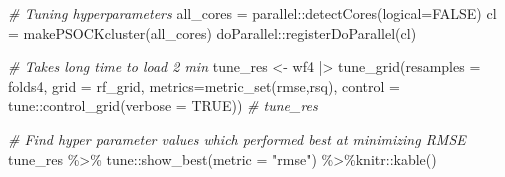 \documentclass[
]{article}
\newenvironment{Shaded}{\begin{snugshade}}{\end{snugshade}}
\newcommand{\AttributeTok}[1]{\textcolor[rgb]{0.77,0.63,0.00}{#1}}
\newcommand{\CommentTok}[1]{\textcolor[rgb]{0.56,0.35,0.01}{\textit{#1}}}
\newcommand{\ConstantTok}[1]{\textcolor[rgb]{0.00,0.00,0.00}{#1}}
\newcommand{\FunctionTok}[1]{\textcolor[rgb]{0.00,0.00,0.00}{#1}}
\newcommand{\NormalTok}[1]{#1}
\newcommand{\OtherTok}[1]{\textcolor[rgb]{0.56,0.35,0.01}{#1}}
\newcommand{\SpecialCharTok}[1]{\textcolor[rgb]{0.00,0.00,0.00}{#1}}
\newcommand{\StringTok}[1]{\textcolor[rgb]{0.31,0.60,0.02}{#1}}
\begin{document}
\begin{Shaded}
\begin{Highlighting}[]
\CommentTok{\# Tuning hyperparameters}
\NormalTok{all\_cores }\OtherTok{=}\NormalTok{ parallel}\SpecialCharTok{::}\FunctionTok{detectCores}\NormalTok{(}\AttributeTok{logical=}\ConstantTok{FALSE}\NormalTok{)}
\NormalTok{cl }\OtherTok{=} \FunctionTok{makePSOCKcluster}\NormalTok{(all\_cores)}
\NormalTok{doParallel}\SpecialCharTok{::}\FunctionTok{registerDoParallel}\NormalTok{(cl)}

\CommentTok{\# Takes long time to load 2 min}
\NormalTok{tune\_res }\OtherTok{\textless{}{-}}\NormalTok{ wf4 }\SpecialCharTok{|\textgreater{}} \FunctionTok{tune\_grid}\NormalTok{(}\AttributeTok{resamples =}\NormalTok{ folds4, }\AttributeTok{grid =}\NormalTok{ rf\_grid, }\AttributeTok{metrics=}\FunctionTok{metric\_set}\NormalTok{(rmse,rsq), }\AttributeTok{control =}\NormalTok{ tune}\SpecialCharTok{::}\FunctionTok{control\_grid}\NormalTok{(}\AttributeTok{verbose =} \ConstantTok{TRUE}\NormalTok{))}
\CommentTok{\# tune\_res}

\CommentTok{\# Find hyper parameter values which performed best at minimizing RMSE}
\NormalTok{tune\_res }\SpecialCharTok{\%\textgreater{}\%}\NormalTok{ tune}\SpecialCharTok{::}\FunctionTok{show\_best}\NormalTok{(}\AttributeTok{metric =} \StringTok{"rmse"}\NormalTok{) }\SpecialCharTok{\%\textgreater{}\%}\NormalTok{knitr}\SpecialCharTok{::}\FunctionTok{kable}\NormalTok{()}
\end{Highlighting}
\end{Shaded}
\end{document}
